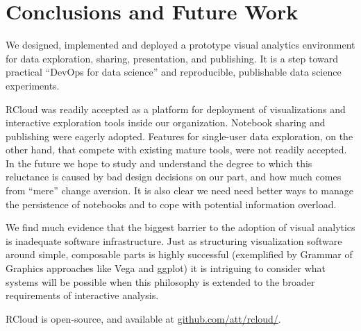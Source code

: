 \section{Conclusions and Future Work}
We designed, implemented and deployed a prototype visual analytics environment
for data exploration, sharing, presentation, and publishing. It is a step toward
practical ``DevOps for data science'' and reproducible, publishable data
science experiments.

RCloud was readily accepted as a platform for deployment of
visualizations and interactive exploration tools inside our organization.  
Notebook sharing and publishing were eagerly adopted.
Features for single-user data exploration, on the other hand, that
compete with existing mature tools, were not readily accepted.
In the future we hope to study and understand the degree to which
this reluctance is caused by bad design decisions on our part, and how
much comes from ``mere'' change aversion. It is also clear we need
need better ways to manage the persistence of notebooks and to cope
with potential information overload.

We find much evidence that the biggest barrier to the adoption of
visual analytics is inadequate software infrastructure.
Just as structuring visualization software around simple,
composable parts is highly successful (exemplified by
Grammar of Graphics approaches like Vega and ggplot)
it is intriguing to consider what systems will be
possible when this philosophy is extended to the
broader requirements of interactive analysis.

RCloud is open-source, and available at \url{github.com/att/rcloud/}.
